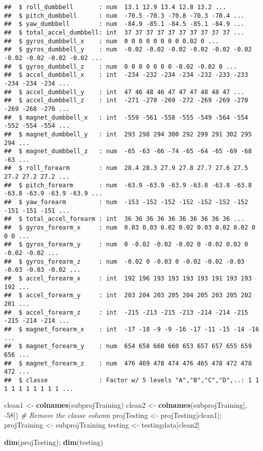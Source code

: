 \documentclass[]{article}
\newenvironment{Shaded}{\begin{snugshade}}{\end{snugshade}}
\newcommand{\KeywordTok}[1]{\textcolor[rgb]{0.13,0.29,0.53}{\textbf{{#1}}}}
\newcommand{\DecValTok}[1]{\textcolor[rgb]{0.00,0.00,0.81}{{#1}}}
\newcommand{\StringTok}[1]{\textcolor[rgb]{0.31,0.60,0.02}{{#1}}}
\newcommand{\CommentTok}[1]{\textcolor[rgb]{0.56,0.35,0.01}{\textit{{#1}}}}
\newcommand{\NormalTok}[1]{{#1}}
\begin{document}
\begin{verbatim}
##  $ roll_dumbbell       : num  13.1 12.9 13.4 12.8 13.2 ...
##  $ pitch_dumbbell      : num  -70.5 -70.3 -70.8 -70.3 -70.4 ...
##  $ yaw_dumbbell        : num  -84.9 -85.1 -84.5 -85.1 -84.9 ...
##  $ total_accel_dumbbell: int  37 37 37 37 37 37 37 37 37 37 ...
##  $ gyros_dumbbell_x    : num  0 0 0 0 0 0 0 0 0.02 0 ...
##  $ gyros_dumbbell_y    : num  -0.02 -0.02 -0.02 -0.02 -0.02 -0.02 -0.02 -0.02 -0.02 -0.02 ...
##  $ gyros_dumbbell_z    : num  0 0 0 0 0 0 0 -0.02 -0.02 0 ...
##  $ accel_dumbbell_x    : int  -234 -232 -234 -234 -232 -233 -233 -234 -234 -234 ...
##  $ accel_dumbbell_y    : int  47 46 48 46 47 47 47 48 48 47 ...
##  $ accel_dumbbell_z    : int  -271 -270 -269 -272 -269 -269 -270 -269 -268 -270 ...
##  $ magnet_dumbbell_x   : int  -559 -561 -558 -555 -549 -564 -554 -552 -554 -554 ...
##  $ magnet_dumbbell_y   : int  293 298 294 300 292 299 291 302 295 294 ...
##  $ magnet_dumbbell_z   : num  -65 -63 -66 -74 -65 -64 -65 -69 -68 -63 ...
##  $ roll_forearm        : num  28.4 28.3 27.9 27.8 27.7 27.6 27.5 27.2 27.2 27.2 ...
##  $ pitch_forearm       : num  -63.9 -63.9 -63.9 -63.8 -63.8 -63.8 -63.8 -63.9 -63.9 -63.9 ...
##  $ yaw_forearm         : num  -153 -152 -152 -152 -152 -152 -152 -151 -151 -151 ...
##  $ total_accel_forearm : int  36 36 36 36 36 36 36 36 36 36 ...
##  $ gyros_forearm_x     : num  0.03 0.03 0.02 0.02 0.03 0.02 0.02 0 0 0 ...
##  $ gyros_forearm_y     : num  0 -0.02 -0.02 -0.02 0 -0.02 0.02 0 -0.02 -0.02 ...
##  $ gyros_forearm_z     : num  -0.02 0 -0.03 0 -0.02 -0.02 -0.03 -0.03 -0.03 -0.02 ...
##  $ accel_forearm_x     : int  192 196 193 193 193 193 191 193 193 192 ...
##  $ accel_forearm_y     : int  203 204 203 205 204 205 203 205 202 201 ...
##  $ accel_forearm_z     : int  -215 -213 -215 -213 -214 -214 -215 -215 -214 -214 ...
##  $ magnet_forearm_x    : int  -17 -18 -9 -9 -16 -17 -11 -15 -14 -16 ...
##  $ magnet_forearm_y    : num  654 658 660 660 653 657 657 655 659 656 ...
##  $ magnet_forearm_z    : num  476 469 478 474 476 465 478 472 478 472 ...
##  $ classe              : Factor w/ 5 levels "A","B","C","D",..: 1 1 1 1 1 1 1 1 1 1 ...
\end{verbatim}

\begin{Shaded}
\begin{Highlighting}[]
\NormalTok{clean1 <-}\StringTok{ }\KeywordTok{colnames}\NormalTok{(subprojTraining)}
\NormalTok{clean2 <-}\StringTok{ }\KeywordTok{colnames}\NormalTok{(subprojTraining[, -}\DecValTok{58}\NormalTok{]) }\CommentTok{# Remove the classe column }
\NormalTok{projTesting <-}\StringTok{ }\NormalTok{projTesting[clean1]; projTraining <-}\StringTok{ }\NormalTok{subprojTraining}
\NormalTok{testing <-}\StringTok{ }\NormalTok{testingdata[clean2]}

\KeywordTok{dim}\NormalTok{(projTesting); }\KeywordTok{dim}\NormalTok{(testing)}
\end{Highlighting}
\end{Shaded}
\end{document}

